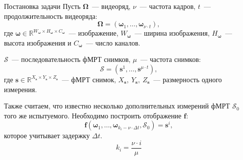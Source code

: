 \documentclass[9pt,pdf]{beamer} %
\begin{document}
\begin{frame}{Постановка задачи}
Пусть $\bm{\Omega}$~--- видеоряд, $\nu$~--- частота кадров, $t$~--- продолжительность видеоряда:
\begin{equation*}
    \bm{\Omega} = (\bm{\omega}_{1}, \dots, \bm{\omega}_{\nu \cdot t}),
\end{equation*}
где $\bm{\omega} \in \mathbb{R}^{W_{\bm{\omega}} \times H_{\bm{\omega}} \times C_{\bm{\omega}}}$~--- изображение, $W_{\bm{\omega}}$~---
ширина изображения, $H_{\bm{\omega}}$~--- высота изображения и $C_{\bm{\omega}}$~--- число каналов.

$\mathcal{S}$~--- последовательность фМРТ снимков,  $\mu$~--- частота снимков:
\begin{equation*}
    \mathcal{S} = (\bm{s}^{1}, \dots, \bm{s}^{\mu \cdot t}),
\end{equation*}
где $\bm{s} \in \mathbb{R}^{X_{\bm{s}} \times Y_{\bm{s}} \times Z_{\bm{s}}}$~--- фМРТ снимок, $X_{\bm{s}},~Y_{\bm{s}},~Z_{\bm{s}}$~--- размерность одного измерения.

Также считаем, что известно несколько дополнительных измерений фМРТ $\mathcal{S}_0$ того же испытуемого.
Необходимо построить отображение $\bm{f}$:
\begin{equation*}
    \bm{f}(\bm{\omega}_{1}, \dots, \bm{\omega}_{k_i - \nu \cdot \Delta t}, \mathcal{S}_0) = \bm{s}^i,
\end{equation*}
которое учитывает задержку $\Delta t$.
\begin{equation*}
    \label{k_i}
    k_i = \dfrac{\nu \cdot i}{\mu}
\end{equation*}
\end{frame}
\end{document}
